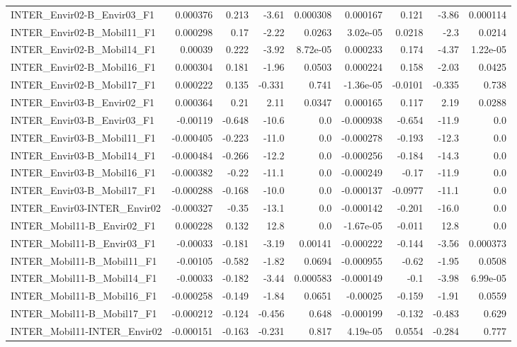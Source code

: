\begin{tabular}{lrrrrrrrr}
INTER_Envir02-B_Envir03_F1 & 0.000376 & 0.213 & -3.61 & 0.000308 & 0.000167 & 0.121 & -3.86 & 0.000114 \\
INTER_Envir02-B_Mobil11_F1 & 0.000298 & 0.17 & -2.22 & 0.0263 & 3.02e-05 & 0.0218 & -2.3 & 0.0214 \\
INTER_Envir02-B_Mobil14_F1 & 0.00039 & 0.222 & -3.92 & 8.72e-05 & 0.000233 & 0.174 & -4.37 & 1.22e-05 \\
INTER_Envir02-B_Mobil16_F1 & 0.000304 & 0.181 & -1.96 & 0.0503 & 0.000224 & 0.158 & -2.03 & 0.0425 \\
INTER_Envir02-B_Mobil17_F1 & 0.000222 & 0.135 & -0.331 & 0.741 & -1.36e-05 & -0.0101 & -0.335 & 0.738 \\
INTER_Envir03-B_Envir02_F1 & 0.000364 & 0.21 & 2.11 & 0.0347 & 0.000165 & 0.117 & 2.19 & 0.0288 \\
INTER_Envir03-B_Envir03_F1 & -0.00119 & -0.648 & -10.6 & 0.0 & -0.000938 & -0.654 & -11.9 & 0.0 \\
INTER_Envir03-B_Mobil11_F1 & -0.000405 & -0.223 & -11.0 & 0.0 & -0.000278 & -0.193 & -12.3 & 0.0 \\
INTER_Envir03-B_Mobil14_F1 & -0.000484 & -0.266 & -12.2 & 0.0 & -0.000256 & -0.184 & -14.3 & 0.0 \\
INTER_Envir03-B_Mobil16_F1 & -0.000382 & -0.22 & -11.1 & 0.0 & -0.000249 & -0.17 & -11.9 & 0.0 \\
INTER_Envir03-B_Mobil17_F1 & -0.000288 & -0.168 & -10.0 & 0.0 & -0.000137 & -0.0977 & -11.1 & 0.0 \\
INTER_Envir03-INTER_Envir02 & -0.000327 & -0.35 & -13.1 & 0.0 & -0.000142 & -0.201 & -16.0 & 0.0 \\
INTER_Mobil11-B_Envir02_F1 & 0.000228 & 0.132 & 12.8 & 0.0 & -1.67e-05 & -0.011 & 12.8 & 0.0 \\
INTER_Mobil11-B_Envir03_F1 & -0.00033 & -0.181 & -3.19 & 0.00141 & -0.000222 & -0.144 & -3.56 & 0.000373 \\
INTER_Mobil11-B_Mobil11_F1 & -0.00105 & -0.582 & -1.82 & 0.0694 & -0.000955 & -0.62 & -1.95 & 0.0508 \\
INTER_Mobil11-B_Mobil14_F1 & -0.00033 & -0.182 & -3.44 & 0.000583 & -0.000149 & -0.1 & -3.98 & 6.99e-05 \\
INTER_Mobil11-B_Mobil16_F1 & -0.000258 & -0.149 & -1.84 & 0.0651 & -0.00025 & -0.159 & -1.91 & 0.0559 \\
INTER_Mobil11-B_Mobil17_F1 & -0.000212 & -0.124 & -0.456 & 0.648 & -0.000199 & -0.132 & -0.483 & 0.629 \\
INTER_Mobil11-INTER_Envir02 & -0.000151 & -0.163 & -0.231 & 0.817 & 4.19e-05 & 0.0554 & -0.284 & 0.777 \\

\end{tabular}
